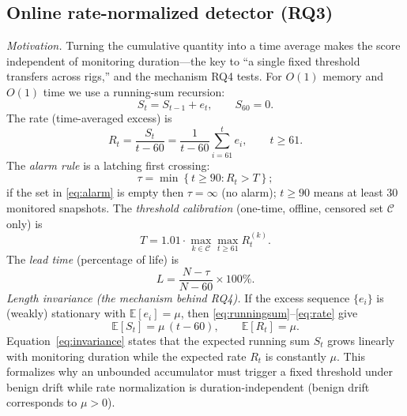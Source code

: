 \documentclass[journal]{IEEEtran}
\newcommand{\E}{\mathbb{E}}
\begin{document}
\subsection{Online rate-normalized detector (RQ3)}\label{sec:rate}
\emph{Motivation.} Turning the cumulative quantity into a time average makes the score independent of monitoring duration---the key to ``a single fixed threshold transfers across rigs,'' and the mechanism RQ4 tests. For $O(1)$ memory and $O(1)$ time we use a running-sum recursion:
\begin{equation}
S_t=S_{t-1}+e_t,\qquad S_{60}=0.
\label{eq:runningsum}
\end{equation}
The rate (time-averaged excess) is
\begin{equation}
R_t=\frac{S_t}{t-60}=\frac{1}{t-60}\sum_{i=61}^{t}e_i,\qquad t\ge61.
\label{eq:rate}
\end{equation}
The \emph{alarm rule} is a latching first crossing:
\begin{equation}
\tau=\min\left\{t\ge90:R_t>T\right\};
\label{eq:alarm}
\end{equation}
if the set in \eqref{eq:alarm} is empty then $\tau=\infty$ (no alarm); $t\ge90$ means at least 30 monitored snapshots. The \emph{threshold calibration} (one-time, offline, censored set $\mathcal{C}$ only) is
\begin{equation}
T=1.01\cdot\max_{k\in\mathcal{C}}\max_{t\ge61}R_t^{(k)}.
\label{eq:threshold}
\end{equation}
The \emph{lead time} (percentage of life) is
\begin{equation}
L=\frac{N-\tau}{N-60}\times100\%.
\label{eq:leadtime}
\end{equation}
\emph{Length invariance (the mechanism behind RQ4).} If the excess sequence $\{e_i\}$ is (weakly) stationary with $\E[e_i]=\mu$, then \eqref{eq:runningsum}--\eqref{eq:rate} give
\begin{equation}
\E[S_t]=\mu\,(t-60),\qquad \E[R_t]=\mu.
\label{eq:invariance}
\end{equation}
Equation~\eqref{eq:invariance} states that the expected running sum $S_t$ grows linearly with monitoring duration while the expected rate $R_t$ is constantly $\mu$. This formalizes why an unbounded accumulator must trigger a fixed threshold under benign drift while rate normalization is duration-independent (benign drift corresponds to $\mu>0$).
\end{document}

